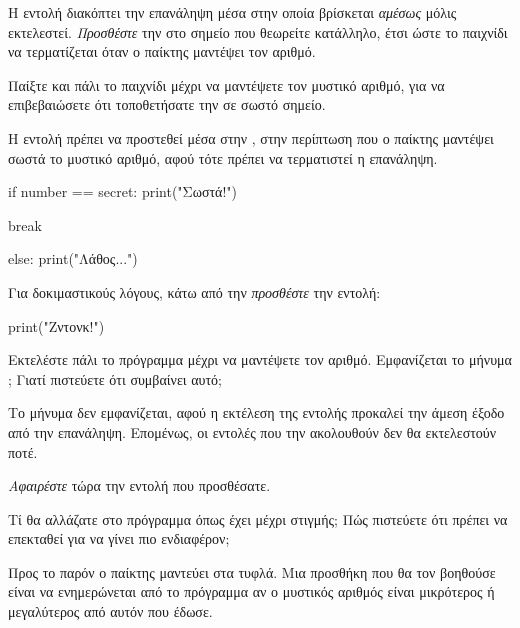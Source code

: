 \documentclass[a4paper,11pt,oneside]{book}
\begin{document}
\begin{step}
Η εντολή  διακόπτει την επανάληψη μέσα στην οποία βρίσκεται \emph{αμέσως} μόλις εκτελεστεί.
\emph{Προσθέστε} την  στο σημείο που θεωρείτε κατάλληλο, έτσι ώστε το παιχνίδι να τερματίζεται όταν ο παίκτης μαντέψει τον αριθμό.

Παίξτε και πάλι το παιχνίδι μέχρι να μαντέψετε τον μυστικό αριθμό, για να επιβεβαιώσετε ότι τοποθετήσατε την  σε σωστό σημείο.

\begin{answer}
	Η εντολή  πρέπει να προστεθεί μέσα στην , στην περίπτωση που ο παίκτης μαντέψει σωστά το μυστικό αριθμό, αφού τότε πρέπει να τερματιστεί η επανάληψη.

\begin{pyplain}
    if number == secret:
        print("Σωστά!")
\end{pyplain}
\begin{pynew}
        break
\end{pynew}
\begin{pyplain}
    else:	
        print("Λάθος...")
\end{pyplain}
\end{answer}
\end{step}

\begin{step}
Για δοκιμαστικούς λόγους, κάτω από την  \emph{προσθέστε} την εντολή:

\begin{pynew}
print("Ζντονκ!")
\end{pynew}

Εκτελέστε πάλι το πρόγραμμα μέχρι να μαντέψετε τον αριθμό. Εμφανίζεται το μήνυμα ; Γιατί πιστεύετε ότι συμβαίνει αυτό;

\begin{answer}
	Το μήνυμα δεν εμφανίζεται, αφού η εκτέλεση της εντολής  προκαλεί την άμεση έξοδο από την επανάληψη. Επομένως, οι εντολές που την ακολουθούν δεν θα εκτελεστούν ποτέ.
\end{answer}

\emph{Αφαιρέστε} τώρα την εντολή που προσθέσατε.
\end{step}

\begin{step}
Τί θα αλλάζατε στο πρόγραμμα όπως έχει μέχρι στιγμής; Πώς πιστεύετε ότι πρέπει να επεκταθεί για να γίνει πιο ενδιαφέρον;

\begin{answer}
	Προς το παρόν ο παίκτης μαντεύει στα τυφλά. Μια προσθήκη που θα τον βοηθούσε είναι να ενημερώνεται από το πρόγραμμα αν ο μυστικός αριθμός είναι μικρότερος ή μεγαλύτερος από αυτόν που έδωσε.
\end{answer}
\end{step}
\end{document}
